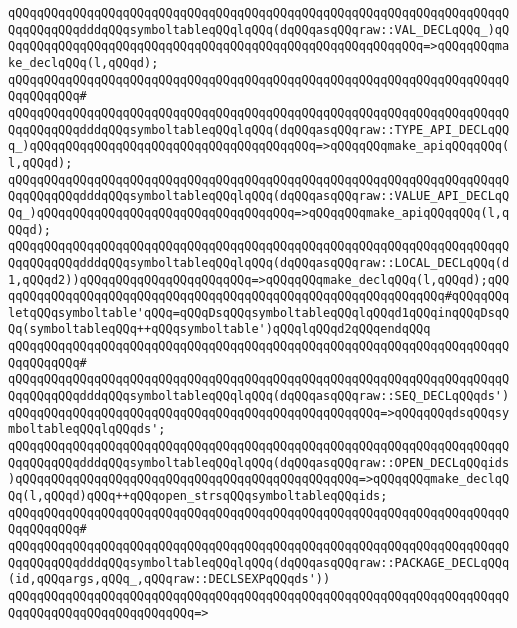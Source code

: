 \verb|qQQqqQQqqQQqqQQqqQQqqQQqqQQqqQQqqQQqqQQqqQQqqQQqqQQqqQQqqQQqqQQqqQQqqQQqqQQqqQQqdddqQQqsymboltableqQQqlqQQq(dqQQqasqQQqraw::VAL_DECLqQQq_)qQQqqQQqqQQqqQQqqQQqqQQqqQQqqQQqqQQqqQQqqQQqqQQqqQQqqQQqqQQq=>qQQqqQQqmake_declqQQq(l,qQQqd);|\newline
\verb|qQQqqQQqqQQqqQQqqQQqqQQqqQQqqQQqqQQqqQQqqQQqqQQqqQQqqQQqqQQqqQQqqQQqqQQqqQQqqQQq#|\newline
\verb|qQQqqQQqqQQqqQQqqQQqqQQqqQQqqQQqqQQqqQQqqQQqqQQqqQQqqQQqqQQqqQQqqQQqqQQqqQQqqQQqdddqQQqsymboltableqQQqlqQQq(dqQQqasqQQqraw::TYPE_API_DECLqQQq_)qQQqqQQqqQQqqQQqqQQqqQQqqQQqqQQqqQQqqQQq=>qQQqqQQqmake_apiqQQqqQQq(l,qQQqd);|\newline
\verb|qQQqqQQqqQQqqQQqqQQqqQQqqQQqqQQqqQQqqQQqqQQqqQQqqQQqqQQqqQQqqQQqqQQqqQQqqQQqqQQqdddqQQqsymboltableqQQqlqQQq(dqQQqasqQQqraw::VALUE_API_DECLqQQq_)qQQqqQQqqQQqqQQqqQQqqQQqqQQqqQQqqQQq=>qQQqqQQqmake_apiqQQqqQQq(l,qQQqd);|\newline
\verb|qQQqqQQqqQQqqQQqqQQqqQQqqQQqqQQqqQQqqQQqqQQqqQQqqQQqqQQqqQQqqQQqqQQqqQQqqQQqqQQqdddqQQqsymboltableqQQqlqQQq(dqQQqasqQQqraw::LOCAL_DECLqQQq(d1,qQQqd2))qQQqqQQqqQQqqQQqqQQqqQQq=>qQQqqQQqmake_declqQQq(l,qQQqd);qQQqqQQqqQQqqQQqqQQqqQQqqQQqqQQqqQQqqQQqqQQqqQQqqQQqqQQqqQQqqQQq#qQQqqQQqletqQQqsymboltable'qQQq=qQQqDsqQQqsymboltableqQQqlqQQqd1qQQqinqQQqDsqQQq(symboltableqQQq++qQQqsymboltable')qQQqlqQQqd2qQQqendqQQq|\newline
\verb|qQQqqQQqqQQqqQQqqQQqqQQqqQQqqQQqqQQqqQQqqQQqqQQqqQQqqQQqqQQqqQQqqQQqqQQqqQQqqQQq#|\newline
\verb|qQQqqQQqqQQqqQQqqQQqqQQqqQQqqQQqqQQqqQQqqQQqqQQqqQQqqQQqqQQqqQQqqQQqqQQqqQQqqQQqdddqQQqsymboltableqQQqlqQQq(dqQQqasqQQqraw::SEQ_DECLqQQqds')qQQqqQQqqQQqqQQqqQQqqQQqqQQqqQQqqQQqqQQqqQQqqQQqqQQq=>qQQqqQQqdsqQQqsymboltableqQQqlqQQqds';|\newline
\verb|qQQqqQQqqQQqqQQqqQQqqQQqqQQqqQQqqQQqqQQqqQQqqQQqqQQqqQQqqQQqqQQqqQQqqQQqqQQqqQQqdddqQQqsymboltableqQQqlqQQq(dqQQqasqQQqraw::OPEN_DECLqQQqids)qQQqqQQqqQQqqQQqqQQqqQQqqQQqqQQqqQQqqQQqqQQqqQQq=>qQQqqQQqmake_declqQQq(l,qQQqd)qQQq++qQQqopen_strsqQQqsymboltableqQQqids;|\newline
\verb|qQQqqQQqqQQqqQQqqQQqqQQqqQQqqQQqqQQqqQQqqQQqqQQqqQQqqQQqqQQqqQQqqQQqqQQqqQQqqQQq#|\newline
\verb|qQQqqQQqqQQqqQQqqQQqqQQqqQQqqQQqqQQqqQQqqQQqqQQqqQQqqQQqqQQqqQQqqQQqqQQqqQQqqQQqdddqQQqsymboltableqQQqlqQQq(dqQQqasqQQqraw::PACKAGE_DECLqQQq(id,qQQqargs,qQQq_,qQQqraw::DECLSEXPqQQqds'))|\newline
\verb|qQQqqQQqqQQqqQQqqQQqqQQqqQQqqQQqqQQqqQQqqQQqqQQqqQQqqQQqqQQqqQQqqQQqqQQqqQQqqQQqqQQqqQQqqQQqqQQq=>|\newline
